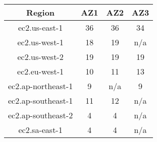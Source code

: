 \begin{tabular}{|c||c|c|c|} \hline
\bf Region & \bf AZ1 &  \bf AZ2 &  \bf AZ3  \\ \hline
ec2.us-east-1 &  36 & 36 & 34\\ \hline
ec2.us-west-1 & 18 & 19 & n/a\\ \hline
ec2.us-west-2 &  19 & 19 & 19\\ \hline
ec2.eu-west-1&  10 & 11 & 13\\ \hline
ec2.ap-northeast-1 & 9 & n/a & 9\\ \hline
ec2.ap-southeast-1 &  11 & 12 & n/a\\ \hline
ec2.ap-southeast-2&    4 & 4 & n/a\\ \hline
ec2.sa-east-1 &  4 & 4& n/a\\ \hline
\end{tabular}
